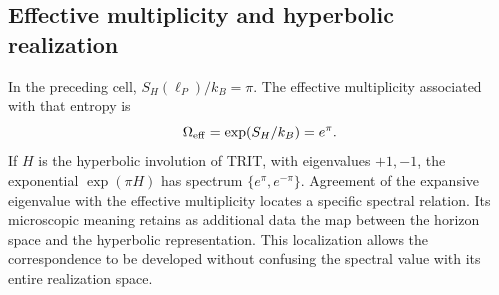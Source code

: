 \subsection{Effective multiplicity and hyperbolic realization}

In the preceding cell, \(S_H(\ell_P)/k_B=\pi\). The effective
multiplicity associated with that entropy is
\[
 \Omega_{\rm eff}=\exp(S_H/k_B)=e^\pi.
\]
If \(H\) is the hyperbolic involution of TRIT, with eigenvalues
\(+1,-1\), the exponential \(\exp(\pi H)\) has spectrum
\(\{e^\pi,e^{-\pi}\}\). Agreement of the expansive eigenvalue
with the effective multiplicity locates a specific spectral relation.
Its microscopic meaning retains as additional data the map between
the horizon space and the hyperbolic representation. This
localization allows the correspondence to be developed without confusing
the spectral value with its entire realization space.
